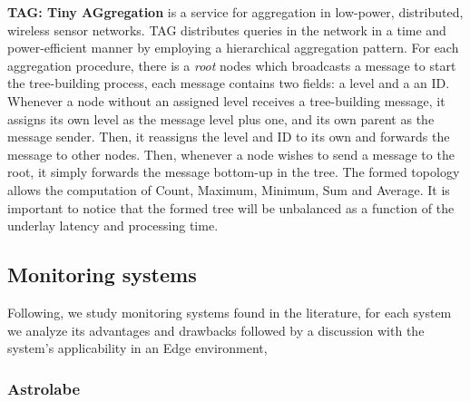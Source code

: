 \textbf{TAG: Tiny AGgregation}\cite{Madden2002} is a service for aggregation in low-power, distributed, wireless sensor networks. TAG distributes queries in the network in a time and power-efficient manner by employing a hierarchical aggregation pattern. For each aggregation procedure, there is a \textit{root} nodes which broadcasts a message to start the tree-building process, each message contains two fields: a level and a an ID. Whenever a node without an assigned level receives a tree-building message, it assigns its own level as the message level plus one, and its own parent as the message sender. Then, it reassigns the level and ID to its own and forwards the message to other nodes. Then, whenever a node wishes to send a message to the root, it simply forwards the message bottom-up in the tree. The formed topology allows the computation of Count, Maximum, Minimum, Sum and Average. It is important to notice that the formed tree will be unbalanced as a function of the underlay latency and processing time.






\subsection{Monitoring systems}

Following, we study monitoring systems found in the literature, for each system we analyze its advantages and drawbacks followed by a discussion with the system's applicability in an Edge environment,

\subsubsection{Astrolabe}

